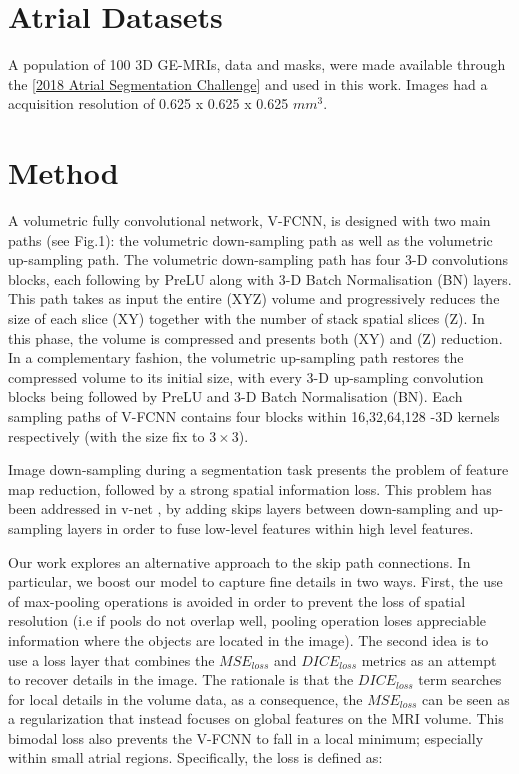 \documentclass{llncs}
\begin{document}
\section{Atrial Datasets}

A population of 100 3D GE-MRIs, data and masks, were made available through the [\href{http://atriaseg2018.cardiacatlas.org/}{2018 Atrial Segmentation Challenge}] and used in this work. Images had a acquisition resolution of 0.625 x 0.625 x 0.625 $mm^3$.

\section{Method}

A volumetric fully convolutional network, V-FCNN, is designed with two main paths (see Fig.1): the volumetric down-sampling path as well as the volumetric up-sampling path. The volumetric down-sampling path has four 3-D convolutions blocks, each following by PreLU along with 3-D Batch Normalisation (BN) layers. This path takes as input the entire (XYZ) volume and progressively reduces the size of each slice (XY) together with the number of stack spatial slices (Z). In this phase, the volume is compressed and presents both (XY) and (Z) reduction.
In a complementary fashion, the volumetric up-sampling path restores the compressed volume to its initial size, with every 3-D up-sampling convolution blocks being followed by PreLU and 3-D Batch Normalisation (BN).
Each sampling paths of V-FCNN contains four blocks within 16,32,64,128 -3D kernels respectively (with the size fix to $3\times3$).

Image down-sampling during a segmentation task
presents the problem of feature map reduction, followed by a strong spatial information loss.
This problem has been addressed in v-net \cite{Fausto}, \cite{Isensee} by adding skips layers between down-sampling and up-sampling layers
in order to fuse low-level features within high level
features.

Our work explores an alternative approach to the skip path connections. In particular, we boost our model to capture fine details in two ways.
First, the use of max-pooling operations is avoided in order to prevent the loss of spatial resolution (i.e if pools do not overlap well, pooling operation loses appreciable information where the objects are located in the image). The second idea is to use a loss layer that combines the $MSE_{loss}$ and $DICE_{loss}$ metrics as an attempt to recover details in the image. The rationale is that the $DICE_{loss}$ term searches for local details in the volume data, as a consequence, the $MSE_{loss}$ can be seen as a regularization that instead focuses on global features on the MRI volume. This bimodal loss also prevents the V-FCNN to fall in a local minimum; especially within small atrial regions. Specifically, the loss is defined as:
\end{document}
